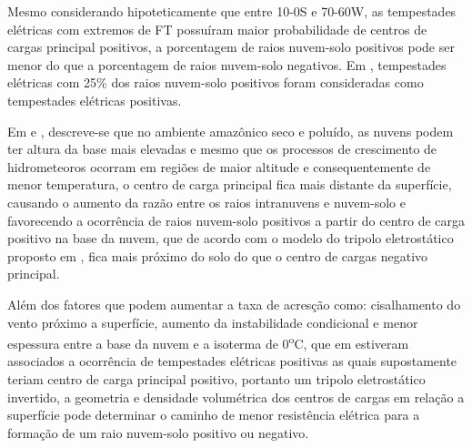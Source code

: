Mesmo considerando hipoteticamente que entre 10-0S e 70-60W, as tempestades elétricas com extremos de FT possuíram maior probabilidade de centros de cargas principal positivos, a porcentagem de raios nuvem-solo  positivos pode ser menor do que a porcentagem de raios nuvem-solo negativos. Em , tempestades elétricas com 25\% dos raios nuvem-solo positivos foram consideradas como tempestades elétricas positivas.

Em  e , descreve-se que no ambiente amazônico seco e poluído, as nuvens podem ter altura da base mais elevadas e mesmo que os processos de crescimento de hidrometeoros ocorram em regiões de maior altitude e consequentemente de menor temperatura, o centro de carga principal fica mais distante da superfície, causando  o aumento da razão entre os raios intranuvens e nuvem-solo e favorecendo a ocorrência de raios nuvem-solo positivos a partir do centro de carga positivo na base da nuvem, que de acordo com o modelo do tripolo eletrostático proposto em , fica mais próximo do solo do que o centro de cargas negativo principal.


Além  dos fatores que podem aumentar a taxa de acresção como: cisalhamento do vento próximo a superfície, aumento da instabilidade condicional e menor espessura entre a base da nuvem e a isoterma de 0\textsuperscript{o}C, que em  estiveram associados a ocorrência de tempestades elétricas positivas as quais supostamente teriam centro de carga principal positivo, portanto um tripolo eletrostático invertido, a geometria e densidade volumétrica dos centros de cargas em relação a superfície pode determinar o caminho de menor resistência elétrica para a formação de um raio nuvem-solo positivo ou negativo.

